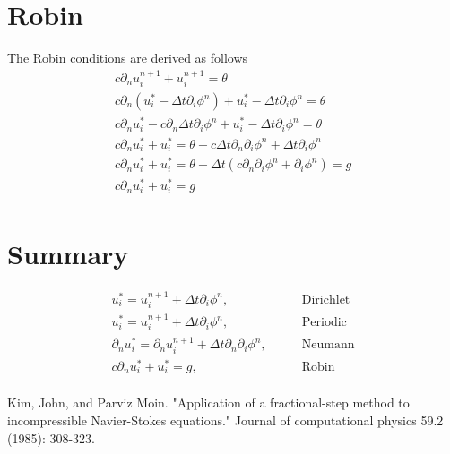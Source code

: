 \documentclass[landscape]{article}
\newcommand{\PD}{\partial}
\begin{document}
\section{Robin}
The Robin conditions are derived as follows
\begin{equation}\begin{aligned}
  c \PD_n u_i^{n+1} + u_i^{n+1} = \theta \\
  c \PD_n (u_i^* - \Delta t \PD_i \phi^n) + u_i^* - \Delta t \PD_i \phi^n = \theta \\
  c \PD_n u_i^* - c \PD_n \Delta t \PD_i \phi^n + u_i^* - \Delta t \PD_i \phi^n = \theta \\
  c \PD_n u_i^* + u_i^* = \theta + c \Delta t \PD_n \PD_i \phi^n + \Delta t \PD_i \phi^n \\
  c \PD_n u_i^* + u_i^* = \theta + \Delta t (c \PD_n \PD_i \phi^n + \PD_i \phi^n) = g \\
  c \PD_n u_i^* + u_i^* = g \\
\end{aligned}\end{equation}

\section{Summary}
\begin{equation}\begin{aligned}
  u_i^* = u_i^{n+1} + \Delta t \PD_i \phi^n, \qquad & \text{Dirichlet} \\
  u_i^* = u_i^{n+1} + \Delta t \PD_i \phi^n, \qquad & \text{Periodic} \\
  \PD_n u_i^* = \PD_n u_i^{n+1} + \Delta t \PD_n \PD_i \phi^n, \qquad & \text{Neumann} \\
  c \PD_n u_i^* + u_i^* = g, \qquad & \text{Robin} \\
\end{aligned}\end{equation}

\begin{thebibliography}{1}
 Kim, John, and Parviz Moin. "Application of a fractional-step method to incompressible Navier-Stokes equations." Journal of computational physics 59.2 (1985): 308-323.
\end{thebibliography}
\end{document}
